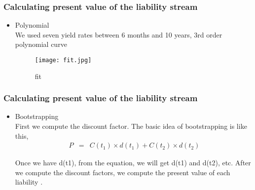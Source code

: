 \documentclass[compress,handout,10pt]{beamer}
\let\olditem\item
\renewcommand{\item}{\setlength{\itemsep}{0.5\baselineskip}\olditem}
\begin{document}
\begin{frame}
    \frametitle{Calculating present value of the liability stream}
\begin{itemize}
\item Polynomial \\
\vspace{1mm}
We used seven yield rates between 6 months and 10 years, 3rd order polynomial curve 
\begin{figure}[bottom]
    \begin{center}
        \texttt{[image: fit.jpg]}
    \end{center}
    \caption{fit}
    \label{figure1}
\end{figure}
\end{itemize}
\end{frame}

\begin{frame}
    \frametitle{Calculating present value of the liability stream}
\begin{itemize}
\item Bootstrapping \\
First we compute the discount factor. The basic idea of bootstrapping is like this,\\
\begin{eqnarray}
  \ P &=& C(t_1) \times d(t_1) + C(t_2) \times d(t_2)
\end{eqnarray}

Once we have d(t1), from the equation, we will get d(t1) and d(t2), etc. After we compute the discount factors, we compute the present value of each liability .
\end{itemize}
\end{frame}
\end{document}

